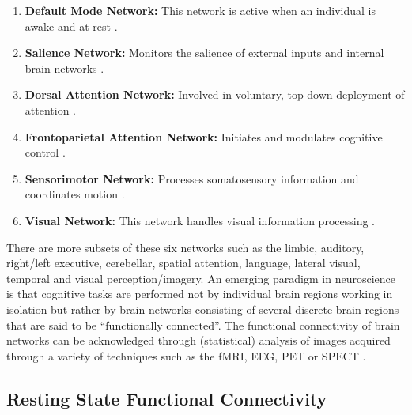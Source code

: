 \documentclass[12pt]{article}
\begin{document}
\newpage

\begin{enumerate}

  \item \textbf{Default Mode Network:} This network is active when an
    individual is awake and at rest \cite{serendipitousDMN}.

  \item \textbf{Salience Network:} Monitors the salience of external
    inputs and internal brain networks
    \cite{saliencemetabolic}\cite{functionalconnectivity}.

  \item \textbf{Dorsal Attention Network:} Involved in voluntary,
    top-down deployment of attention \cite{thomasorganization}.

  \item \textbf{Frontoparietal Attention Network:} Initiates and
    modulates cognitive control \cite{frontoparietalAttentionFunc}.

  \item \textbf{Sensorimotor Network:} Processes somatosensory
    information and coordinates motion \cite{heine2012resting}.

  \item \textbf{Visual Network:} This network handles visual
    information processing \cite{brainvisual}.

\end{enumerate}

There are more subsets of these six networks such as the limbic,
auditory, right/left executive, cerebellar, spatial attention,
language, lateral visual, temporal and visual perception/imagery. An
emerging paradigm in neuroscience is that cognitive tasks are
performed not by individual brain regions working in isolation but
rather by brain networks consisting of several discrete brain regions
that are said to be ``functionally connected''. The functional
connectivity of brain networks can be acknowledged through
(statistical) analysis of images acquired through a variety of
techniques such as the fMRI, EEG, PET or SPECT
\cite{wikibrainnetworks}.

\subsection{Resting State Functional Connectivity}
\end{document}
